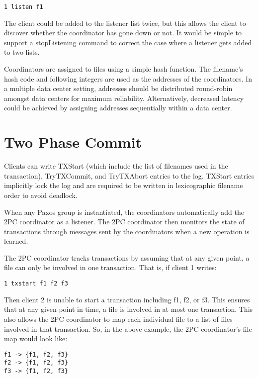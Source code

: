 \documentclass[11pt]{article}
\begin{document}
\begin{verbatim}
1 listen f1
\end{verbatim}

The client could be added to the listener list twice, but this allows the client to discover whether the coordinator has gone down or not.
It would be simple to support a stopListening command to correct the case where a listener gets added to two lists.

Coordinators are assigned to files using a simple hash function.
The filename's hash code and following integers are used as the addresses of the coordinators.
In a multiple data center setting, addresses should be distributed round-robin amongst data centers for maximum reliability.
Alternatively, decreased latency could be achieved by assigning addresses sequentially within a data center.

\section{Two Phase Commit}

Clients can write TXStart (which include the list of filenames used in the transaction), TryTXCommit, and TryTXAbort entries to the log.
TXStart entries implicitly lock the log and are required to be written in lexicographic filename order to avoid deadlock.

When any Paxos group is instantiated, the coordinators automatically add the 2PC coordinator as a listener.
The 2PC coordinator then monitors the state of transactions through messages sent by the coordinators when a new operation is learned.

The 2PC coordinator tracks transactions by assuming that at any given point, a file can only be involved in one transaction.
That is, if client 1 writes:
\begin{verbatim}
1 txstart f1 f2 f3
\end{verbatim}

Then client 2 is unable to start a transaction including f1, f2, or f3.
This ensures that at any given point in time, a file is involved in at most one transaction.
This also allows the 2PC coordinator to map each individual file to a list of files involved in that transaction.
So, in the above example, the 2PC coordinator's file map would look like:

\begin{verbatim}
f1 -> {f1, f2, f3}
f2 -> {f1, f2, f3}
f3 -> {f1, f2, f3}
\end{verbatim}
\end{document}
